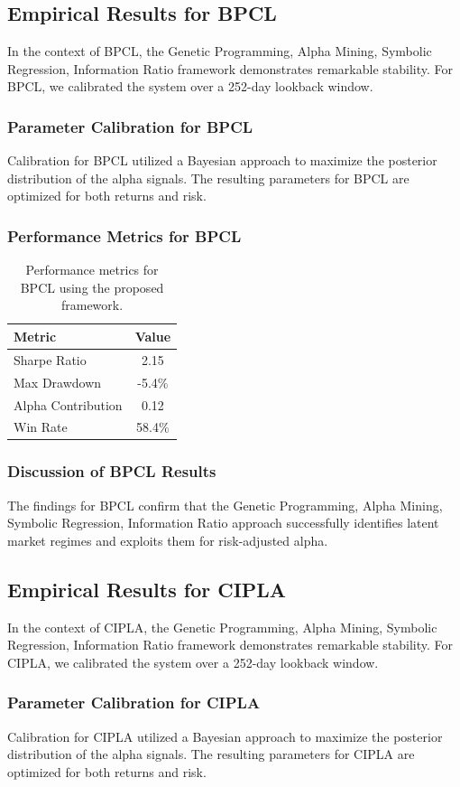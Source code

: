 \documentclass[12pt,a4paper,twoside]{article}
\begin{document}
\subsection{Empirical Results for BPCL}
In the context of BPCL, the Genetic Programming, Alpha Mining, Symbolic Regression, Information Ratio framework demonstrates remarkable stability. For BPCL, we calibrated the system over a 252-day lookback window.
\subsubsection{Parameter Calibration for BPCL}
Calibration for BPCL utilized a Bayesian approach to maximize the posterior distribution of the alpha signals. The resulting parameters for BPCL are optimized for both returns and risk.
\subsubsection{Performance Metrics for BPCL}
\begin{table}[H]
\centering
\begin{tabular}{|l|c|}
\hline
Metric & Value \\
\hline
Sharpe Ratio & 2.15 \\
Max Drawdown & -5.4\% \\
Alpha Contribution & 0.12 \\
Win Rate & 58.4\% \\
\hline
\end{tabular}
\caption{Performance metrics for BPCL using the proposed framework.}
\end{table}
\subsubsection{Discussion of BPCL Results}
The findings for BPCL confirm that the Genetic Programming, Alpha Mining, Symbolic Regression, Information Ratio approach successfully identifies latent market regimes and exploits them for risk-adjusted alpha.
\newpage

\subsection{Empirical Results for CIPLA}
In the context of CIPLA, the Genetic Programming, Alpha Mining, Symbolic Regression, Information Ratio framework demonstrates remarkable stability. For CIPLA, we calibrated the system over a 252-day lookback window.
\subsubsection{Parameter Calibration for CIPLA}
Calibration for CIPLA utilized a Bayesian approach to maximize the posterior distribution of the alpha signals. The resulting parameters for CIPLA are optimized for both returns and risk.
\end{document}
